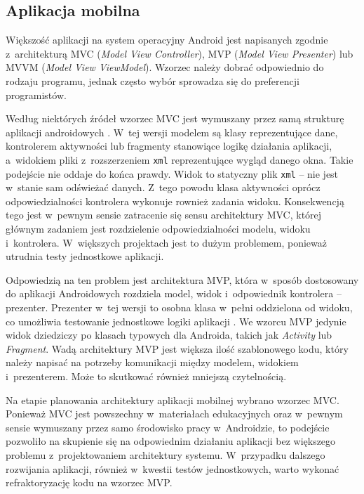 \documentclass[a4paper,twoside,12pt]{book}
\newcommand{\ksremark}[1]{%
{%
{\color{brickred}{[#1]}}}%
\addcontentsline{rks}{uwagas}{\protect{#1}}%
}
\newcommand{\obcy}[1]{\emph{#1}}
\newcommand{\english}[1]{{\selectlanguage{british}\obcy{#1}}}
\begin{document}
\subsection{Aplikacja mobilna}
\label{sec:1}

Większość aplikacji na system operacyjny Android jest napisanych zgodnie z~architekturą MVC (\english{Model View Controller}), MVP (\english{Model View Presenter}) lub MVVM (\english{Model View ViewModel}). Wzorzec należy dobrać odpowiednio do rodzaju programu, jednak często wybór sprowadza się do preferencji programistów. 

Według niektórych źródeł wzorzec MVC jest wymuszany przez samą strukturę aplikacji androidowych \cite{bib:internetMVC}. W~tej wersji modelem są klasy reprezentujące dane, kontrolerem aktywności lub fragmenty stanowiące logikę działania aplikacji, a~widokiem pliki z~rozszerzeniem \texttt{xml} reprezentujące wygląd danego okna. Takie podejście nie oddaje do końca prawdy. Widok to statyczny plik \texttt{xml} -- nie jest w~stanie sam odświeżać danych. Z~tego powodu klasa aktywności oprócz odpowiedzialności kontrolera wykonuje rownież zadania widoku. Konsekwencją tego jest w~pewnym sensie zatracenie się sensu architektury MVC, której głównym zadaniem jest rozdzielenie odpowiedzialności modelu, widoku i~kontrolera. W~większych projektach jest to dużym problemem, ponieważ utrudnia testy jednostkowe aplikacji.

Odpowiedzią na ten problem jest architektura MVP, która w~sposób dostosowany do aplikacji Androidowych rozdziela model, widok i~odpowiednik kontrolera -- prezenter. Prezenter w~tej wersji to osobna klasa w~pełni oddzielona od widoku, co umożliwia testowanie jednostkowe logiki aplikacji \cite{bib:lou2016comparison}. We wzorcu MVP jedynie widok dziedziczy po klasach typowych dla Androida, takich jak \english{Activity} lub \english{Fragment}. Wadą architektury MVP jest większa ilość szablonowego kodu, który należy napisać na potrzeby komunikacji między modelem, widokiem i~prezenterem. Może to skutkować również mniejszą czytelnością.

Na etapie planowania architektury aplikacji mobilnej wybrano wzorzec MVC. Ponieważ MVC jest powszechny w~materiałach edukacyjnych oraz w~pewnym sensie wymuszany przez samo środowisko pracy w~Androidzie, to podejście pozwoliło na skupienie się na odpowiednim działaniu aplikacji bez większego problemu z~projektowaniem architektury systemu. W~przypadku dalszego rozwijania aplikacji, również w~kwestii testów jednostkowych, warto wykonać refraktoryzację kodu na wzorzec MVP. 
\end{document}
